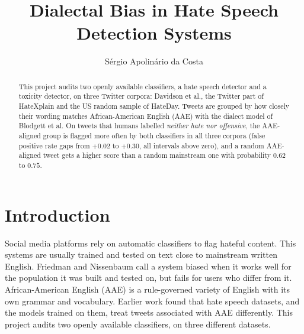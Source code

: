 \documentclass[runningheads,a4paper,oribibl]{llncs}
\begin{document}
\pagestyle{headings}

\mainmatter

\title{Dialectal Bias in Hate Speech Detection Systems}

\author{S\'{e}rgio Apolin\'{a}rio da Costa}


\maketitle

\begin{abstract}
This project audits two openly available classifiers, a hate speech detector and a toxicity detector, on
three Twitter corpora: Davidson et al., the Twitter part of HateXplain and the US random sample
of HateDay. Tweets are grouped by how closely their wording matches African-American English
(AAE) with the dialect model of Blodgett et al. On tweets that humans labelled 
\emph{neither hate nor offensive}, the AAE-aligned group is flagged more often by both classifiers
in all three corpora (false positive rate gaps from $+0.02$ to $+0.30$, all intervals above 
zero), and a random AAE-aligned tweet gets a higher score than a random mainstream one with
probability $0.62$ to $0.75$.
\end{abstract}

\section{Introduction}
Social media platforms rely on automatic classifiers to flag hateful content. This systems are
usually trained and tested on text close to mainstream written English. Friedman and Nissenbaum
call a system biased when it works well for the population it was built and tested on, but fails
for users who differ from it. African-American English (AAE) is a rule-governed variety of English
with its own grammar and vocabulary. Earlier work found that hate speech datasets, and the models
trained on them, treat tweets associated with AAE differently. This project audits two
openly available classifiers, on three different datasets.
\end{document}
